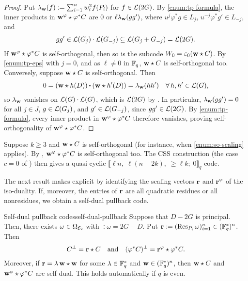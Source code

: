 \documentclass[twocolumn, 11pt]{scrartcl}
\begin{document}
\begin{proof}
    Put $\lambda_\mathbf{w}(f):=\sum_{i=1}^nw_i^2f(P_i)$ for $f\in\mathcal{L}(2G)$. By \ref{enum:tp-formula}, the inner products in $\mathbf{w}^\varphi\star \varphi^*C$ are $0$ or $\ell\lambda_\mathbf{w}(gg')$, where $u^j\varphi^*g\in L_j$, $u^{-j}\varphi^*g'\in L_{-j}$, and
    \[ gg'\in\mathcal{L}(G_j)\cdot\mathcal{L}(G_{-j})\subseteq\mathcal{L}(G_j+G_{-j})=\mathcal{L}(2G). \]
    If $\mathbf{w}^\varphi\star \varphi^*C$ is self-orthogonal, then so is the subcode $W_0=\varepsilon_0(\mathbf{w}\star C)$. By \ref{enum:tp-eps} with $j=0$, and as $\ell\neq0$ in $\mathbb{F}_q$, $\mathbf{w}\star C$ is self-orthogonal too. Conversely, suppose $\mathbf{w}\star C$ is self-orthogonal. Then
    \[ 0=(\bfw\star h(D))\dotpr(\bfw\star h'(D))=\lambda_\bfw(hh') \quad\forall h,h'\in\mcL(G),\]
    so $\lambda_\mathbf{w}$ vanishes on $\mathcal{L}(G)\cdot\mathcal{L}(G)$, which is $\mathcal{L}(2G)$ by \cite[Thm.~6]{mumford1970varieties}. In particular, $\lambda_\mathbf{w}(gg')=0$ for all $j\in J$, $g\in\mathcal{L}(G_j)$, and $g'\in\mathcal{L}(G_{-j})$, since $gg'\in\mathcal{L}(2G)$. By \ref{enum:tp-formula}, every inner product in $\mathbf{w}^\varphi\star\varphi^*C$ therefore vanishes, proving self-orthogonality of $\mathbf{w}^\varphi\star \varphi^*C$.
\end{proof}

Suppose $k\geq3$ and $\mathbf{w}\star C$ is self-orthogonal (for instance, when \ref{enum:so-scaling} applies). By , $\mathbf{w}^\varphi\star\varphi^*C$ is self-orthogonal too. The CSS construction \cite{ketkar2006nonbinary} (the case $c=0$ of ) then gives a quasi-cyclic $\llbracket \ell n,\;\ell(n-2k),\;\geq\ell k;\;0\rrbracket_q$ code.

The next result makes  explicit by identifying the scaling vectors $\mathbf{r}$ and $\mathbf{r}^\varphi$ of the iso-duality. If, moreover, the entries of $\mathbf{r}$ are all quadratic residues or all nonresidues, we obtain a self-dual pullback code.

\begin{proposition}{Self-dual pullback codes}{self-dual-pullback}
    Suppose that $D-2G$ is principal. Then, there exists $\omega\in\Omega_{\mathcal{E}_2}$ with $\div\omega=2G-D$. Put $\mathbf{r}:=(\operatorname{Res}_{P_i}\omega)_{i=1}^n\in(\mathbb{F}_q^*)^n$. Then
    \[ C^\perp=\mathbf{r}\star C\quad\text{and}\quad (\varphi^*C)^\perp=\mathbf{r}^\varphi\star \varphi^*C. \]
    Moreover, if $\mathbf{r}=\lambda\,\mathbf{w}\star\mathbf{w}$ for some $\lambda\in\mathbb{F}_q^*$ and $\mathbf{w}\in(\mathbb{F}_q^*)^n$, then $\mathbf{w}\star C$ and $\mathbf{w}^\varphi\star \varphi^*C$ are self-dual. This holds automatically if $q$ is even.
\end{proposition}
\end{document}

